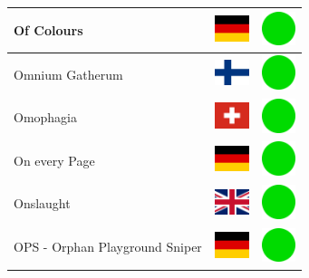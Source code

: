 \documentclass[12pt, a4paper, twoside]{report}
\begin{document}
\begin{center}
\begin{longtable}{|p{5cm}|p{2cm}|p{2cm}|}
 Of Colours                                                 & \includegraphics[width=1cm]{../4x3/de} &   \includegraphics[width=1cm]{../likes/y} \\ \hline
 Omnium Gatherum                                            & \includegraphics[width=1cm]{../4x3/fi} &   \includegraphics[width=1cm]{../likes/y} \\ \hline
 Omophagia                                                  & \includegraphics[width=1cm]{../4x3/ch} &   \includegraphics[width=1cm]{../likes/y} \\ \hline
 On every Page                                              & \includegraphics[width=1cm]{../4x3/de} &   \includegraphics[width=1cm]{../likes/y} \\ \hline
 Onslaught                                                  & \includegraphics[width=1cm]{../4x3/gb} &   \includegraphics[width=1cm]{../likes/y} \\ \hline
 OPS - Orphan Playground Sniper                             & \includegraphics[width=1cm]{../4x3/de} &   \includegraphics[width=1cm]{../likes/y} \\ \hline

\end{longtable}
\end{center}
\end{document}
